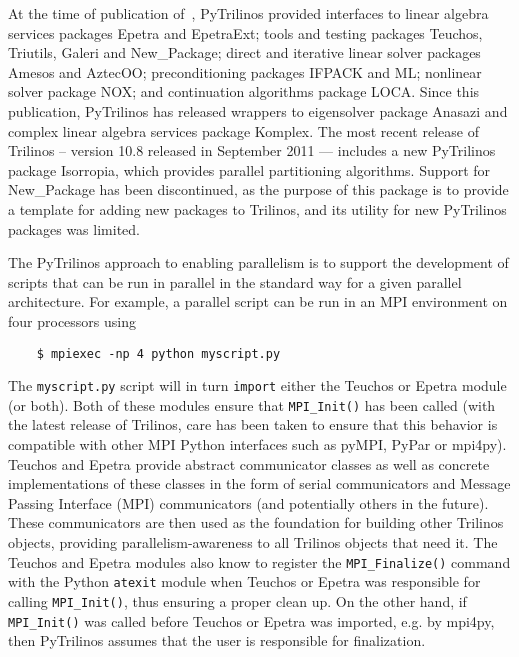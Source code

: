 \documentclass[11pt]{article}
\begin{document}
At the time of publication of~\cite{PyTrilinos}, PyTrilinos provided interfaces to linear algebra services packages Epetra and EpetraExt; tools and testing packages Teuchos, Triutils, Galeri and New\_Package; direct and iterative linear solver packages Amesos and AztecOO; preconditioning packages IFPACK and ML; nonlinear solver package NOX; and continuation algorithms package LOCA.  Since this publication, PyTrilinos has released wrappers to eigensolver package Anasazi and complex linear algebra services package Komplex.  The most recent release of Trilinos -- version 10.8 released in September 2011 --- includes a new PyTrilinos package Isorropia, which provides parallel partitioning algorithms.  Support for New\_Package has been discontinued, as the purpose of this package is to provide a template for adding new packages to Trilinos, and its utility for new PyTrilinos packages was limited.

The PyTrilinos approach to enabling parallelism is to support the development of scripts that can be run in parallel in the standard way for a given parallel architecture.  For example, a parallel script can be run in an MPI environment on four processors using

\begin{verbatim}
    $ mpiexec -np 4 python myscript.py
\end{verbatim}

The {\tt myscript.py} script will in turn {\tt import} either the Teuchos or Epetra module (or both).  Both of these modules ensure that {\tt MPI\_Init()} has been called (with the latest release of Trilinos, care has been taken to ensure that this behavior is compatible with other MPI Python interfaces such as pyMPI, PyPar or mpi4py).  Teuchos and Epetra provide abstract communicator classes as well as concrete implementations of these classes in the form of serial communicators and Message Passing Interface (MPI) communicators (and potentially others in the future).  These communicators are then used as the foundation for building other Trilinos objects, providing parallelism-awareness to all Trilinos objects that need it.  The Teuchos and Epetra modules also know to register the {\tt MPI\_Finalize()} command with the Python {\tt atexit} module when Teuchos or Epetra was responsible for calling {\tt MPI\_Init()}, thus ensuring a proper clean up.  On the other hand, if {\tt MPI\_Init()} was called before Teuchos or Epetra was imported, e.g. by mpi4py, then PyTrilinos assumes that the user is responsible for finalization.
\end{document}
